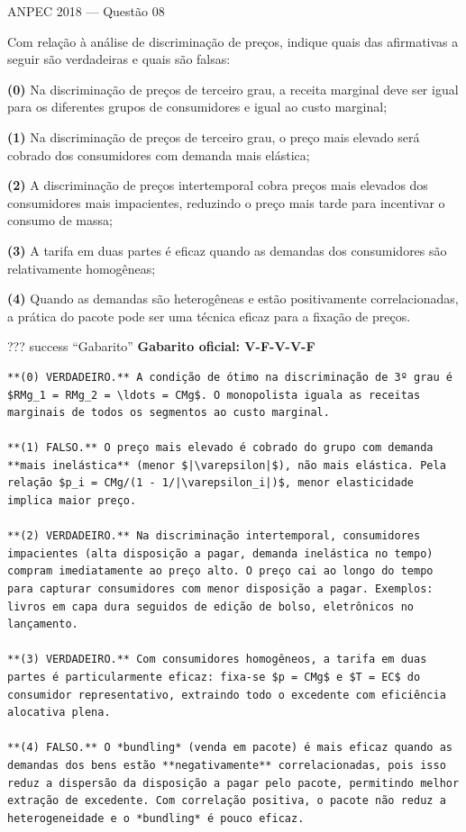 \documentclass[11pt,twoside,openright]{book}
\begin{document}
\begin{infobox}{ANPEC 2018 — Questão 08}

Com relação à análise de discriminação de preços, indique quais das
afirmativas a seguir são verdadeiras e quais são falsas:

\textbf{(0)} Na discriminação de preços de terceiro grau, a receita
marginal deve ser igual para os diferentes grupos de consumidores e
igual ao custo marginal;

\textbf{(1)} Na discriminação de preços de terceiro grau, o preço mais
elevado será cobrado dos consumidores com demanda mais elástica;

\textbf{(2)} A discriminação de preços intertemporal cobra preços mais
elevados dos consumidores mais impacientes, reduzindo o preço mais tarde
para incentivar o consumo de massa;

\textbf{(3)} A tarifa em duas partes é eficaz quando as demandas dos
consumidores são relativamente homogêneas;

\textbf{(4)} Quando as demandas são heterogêneas e estão positivamente
correlacionadas, a prática do pacote pode ser uma técnica eficaz para a
fixação de preços.

??? success ``Gabarito'' \textbf{Gabarito oficial: V-F-V-V-F}

\begin{verbatim}
**(0) VERDADEIRO.** A condição de ótimo na discriminação de 3º grau é $RMg_1 = RMg_2 = \ldots = CMg$. O monopolista iguala as receitas marginais de todos os segmentos ao custo marginal.

**(1) FALSO.** O preço mais elevado é cobrado do grupo com demanda **mais inelástica** (menor $|\varepsilon|$), não mais elástica. Pela relação $p_i = CMg/(1 - 1/|\varepsilon_i|)$, menor elasticidade implica maior preço.

**(2) VERDADEIRO.** Na discriminação intertemporal, consumidores impacientes (alta disposição a pagar, demanda inelástica no tempo) compram imediatamente ao preço alto. O preço cai ao longo do tempo para capturar consumidores com menor disposição a pagar. Exemplos: livros em capa dura seguidos de edição de bolso, eletrônicos no lançamento.

**(3) VERDADEIRO.** Com consumidores homogêneos, a tarifa em duas partes é particularmente eficaz: fixa-se $p = CMg$ e $T = EC$ do consumidor representativo, extraindo todo o excedente com eficiência alocativa plena.

**(4) FALSO.** O *bundling* (venda em pacote) é mais eficaz quando as demandas dos bens estão **negativamente** correlacionadas, pois isso reduz a dispersão da disposição a pagar pelo pacote, permitindo melhor extração de excedente. Com correlação positiva, o pacote não reduz a heterogeneidade e o *bundling* é pouco eficaz.
\end{verbatim}

\end{infobox}
\end{document}
